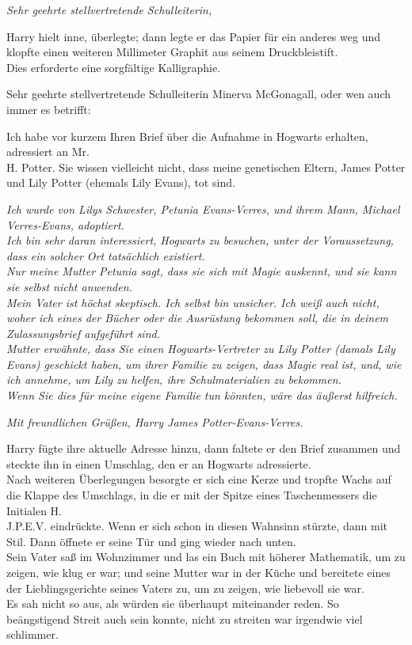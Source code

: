{\emph{Sehr geehrte stellvertretende Schulleiterin,}

Harry hielt inne, überlegte; dann legte er das Papier für ein anderes weg und klopfte einen weiteren Millimeter Graphit aus seinem Druckbleistift.\\ Dies erforderte eine sorgfältige Kalligraphie.

Sehr geehrte stellvertretende Schulleiterin Minerva McGonagall, oder wen auch immer es betrifft:

Ich habe vor kurzem Ihren Brief über die Aufnahme in Hogwarts erhalten, adressiert an Mr.\\ H. Potter. Sie wissen vielleicht nicht, dass meine genetischen Eltern, James Potter und Lily Potter (ehemals Lily Evans), tot sind.

\emph{Ich wurde von Lilys Schwester, Petunia Evans-Verres, und ihrem Mann, Michael Verres-Evans, adoptiert.\\ Ich bin sehr daran interessiert, Hogwarts zu besuchen, unter der Voraussetzung, dass ein solcher Ort tatsächlich existiert.\\ Nur meine Mutter Petunia sagt, dass sie sich mit Magie auskennt, und sie kann sie selbst nicht anwenden.\\ Mein Vater ist höchst skeptisch. Ich selbst bin unsicher. Ich weiß auch nicht, woher ich eines der Bücher oder die Ausrüstung bekommen soll, die in deinem Zulassungsbrief aufgeführt sind.\\ Mutter erwähnte, dass Sie einen Hogwarts-Vertreter zu Lily Potter (damals Lily Evans) geschickt haben, um ihrer Familie zu zeigen, dass Magie real ist, und, wie ich annehme, um Lily zu helfen, ihre Schulmaterialien zu bekommen.\\ Wenn Sie dies für meine eigene Familie tun könnten, wäre das äußerst hilfreich.}

\emph{Mit freundlichen Grüßen, Harry James Potter-Evans-Verres.}

Harry fügte ihre aktuelle Adresse hinzu, dann faltete er den Brief zusammen und steckte ihn in einen Umschlag, den er an Hogwarts adressierte.\\ Nach weiteren Überlegungen besorgte er sich eine Kerze und tropfte Wachs auf die Klappe des Umschlags, in die er mit der Spitze eines Taschenmessers die Initialen H.\\ J.P.E.V. eindrückte. Wenn er sich schon in diesen Wahnsinn stürzte, dann mit Stil. Dann öffnete er seine Tür und ging wieder nach unten.\\ Sein Vater saß im Wohnzimmer und las ein Buch mit höherer Mathematik, um zu zeigen, wie klug er war; und seine Mutter war in der Küche und bereitete eines der Lieblingsgerichte seines Vaters zu, um zu zeigen, wie liebevoll sie war.\\ Es sah nicht so aus, als würden sie überhaupt miteinander reden. So beängstigend Streit auch sein konnte, nicht zu streiten war irgendwie viel schlimmer.

}
